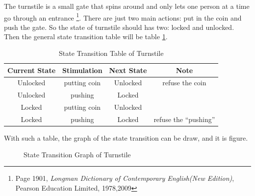 \documentclass{article}
\begin{document}
    The turnstile is a small gate that spins around and only lets one person at a time go through an entrance%
    \footnote{Page 1901, \textit{Longman Dictionary of Contemporary English(New Edition)}, \textcopyright Pearson Education Limited, 1978,2009}.
    There are just two main actions: put in the coin and push the gate. So the state of turnstile should has two: locked
    and unlocked.
    Then the general state transition table will be table \ref{tab:tuenstile:state_transition}.
    \begin{table}[h!]
        \centering
        \begin{tabular}{|c|c|c|c|}
            \hline Current State & Stimulation & Next State & Note \\ 
            \hline Unlocked & putting coin & Unlocked & refuse the coin \\ 
            \hline Unlocked & pushing & Locked &  \\ 
            \hline Locked & putting coin & Unlocked &  \\ 
            \hline Locked & pushing & Locked & refuse the ``pushing'' \\ 
            \hline 
        \end{tabular}
        \caption{State Transition Table of Turnstile}
        \label{tab:tuenstile:state_transition}
    \end{table}
    
    With such a table, the graph of the state transition can be draw, and it is figure.
    
    \begin{figure}[h!]
        \centering
        \caption{State Transition Graph of Turnstile}
    \end{figure}
    
\end{document}
